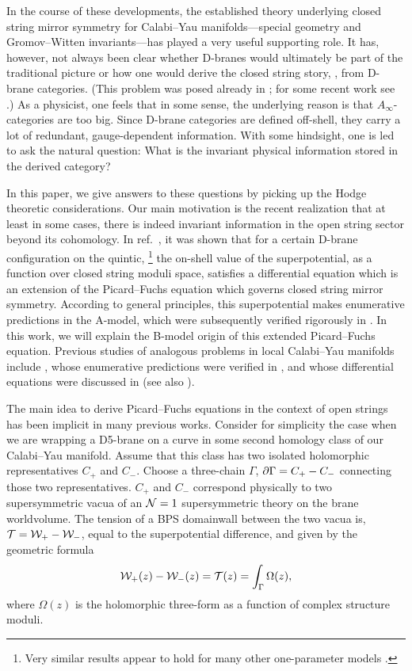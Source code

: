 In the course of these developments, the established theory underlying
closed string mirror symmetry for Calabi--Yau manifolds---special 
geometry and Gromov--Witten invariants---has played a very useful
supporting role. It has, however, not always been clear whether 
D-branes would ultimately be part of the traditional picture or
how one would derive the closed string story, \eg, from D-brane 
categories. (This problem was posed already in \cite{hms}; for 
some recent work see \cite{Kapustin:2004df,MR2298823,caldararu-willerton}.)
As a physicist, one feels that in some sense, the underlying 
reason is that $A_\infty$-categories are too big. Since D-brane 
categories are defined off-shell, they carry a lot of redundant, 
gauge-dependent information. With some hindsight, one is led to ask 
the natural question: What is the invariant physical information stored 
in the derived category? 

In this paper, we give answers to these questions by picking up the Hodge 
theoretic considerations. Our main motivation is the recent realization
that at least in some cases, there is indeed invariant information 
in the open string sector beyond its cohomology. In ref.\ \cite{open},
it was shown that for a certain D-brane configuration on the quintic,%
\footnote{Very similar results appear to hold for many other 
one-parameter models \cite{private1, private2}.} the on-shell value of the 
superpotential, as a function over closed string moduli space, satisfies 
a differential equation which is an extension of the Picard--Fuchs equation 
which governs closed string mirror symmetry. According to general 
principles, this superpotential makes enumerative predictions in the 
A-model, which were subsequently verified rigorously in \cite{psw}. 
In this work, we will explain the B-model origin of this extended
Picard--Fuchs equation. Previous studies of analogous problems in local 
Calabi--Yau manifolds include \cite{agva,akv}, whose enumerative predictions 
were verified in \cite{grza,mayr}, and whose differential equations were 
discussed in \cite{lmw1, lmw2} 
(see also \cite{Govindarajan:2001zk,MR2282975}). 

The main idea to derive Picard--Fuchs equations in the context of open
strings has been implicit in many previous works. Consider for simplicity 
the case when we are wrapping a D5-brane on a curve in some second homology 
class of our Calabi--Yau manifold. Assume that this class has two isolated 
holomorphic representatives $C_+$ and $C_-$. Choose a three-chain
$\Gamma$, $\partial\Gamma=C_+-C_-$ connecting those two representatives.
$C_+$ and $C_-$ correspond physically to two supersymmetric vacua of
an ${\cal N}=1$ supersymmetric theory on the brane worldvolume. The 
tension of a BPS domainwall between the two vacua is, ${\cal T}={\cal W}_+-
{\cal W}_-$, equal to the superpotential difference, and given by the
geometric formula \cite{wittenqcd}
\begin{equation}
\eqlabel{asin}
\calw_+(z)-\calw_-(z) = \calt(z) = \int_\Gamma \Omega (z) ,
\end{equation}
where $\Omega(z)$ is the holomorphic three-form as a function of
complex structure moduli.

